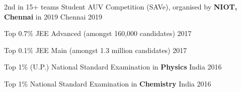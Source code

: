 \begin{cvhonors}

  \cvhonor
    {2nd in 15+ teams}
    {Student AUV Competition (SAVe), \break organised by\textbf{ NIOT, Chennai} in 2019} 
    {Chennai} 
    {2019}
 
  \cvhonor
  {Top 0.7\%}
  {JEE Advanced (amongst 160,000 candidates)}
  {}
  {2017}

  \cvhonor
  {Top 0.1\%}
  {JEE Main (amongst 1.3 million candidates)}
  {}
  {2017}
  
  \cvhonor
  {Top 1\% (U.P.)} 
  {National Standard Examination in \textbf{Physics}}
  {India}
  {2016}
 
  \cvhonor
  {Top 1\%} 
  {National Standard Examination in \textbf{Chemistry}}
  {India}
  {2016}

\end{cvhonors}

